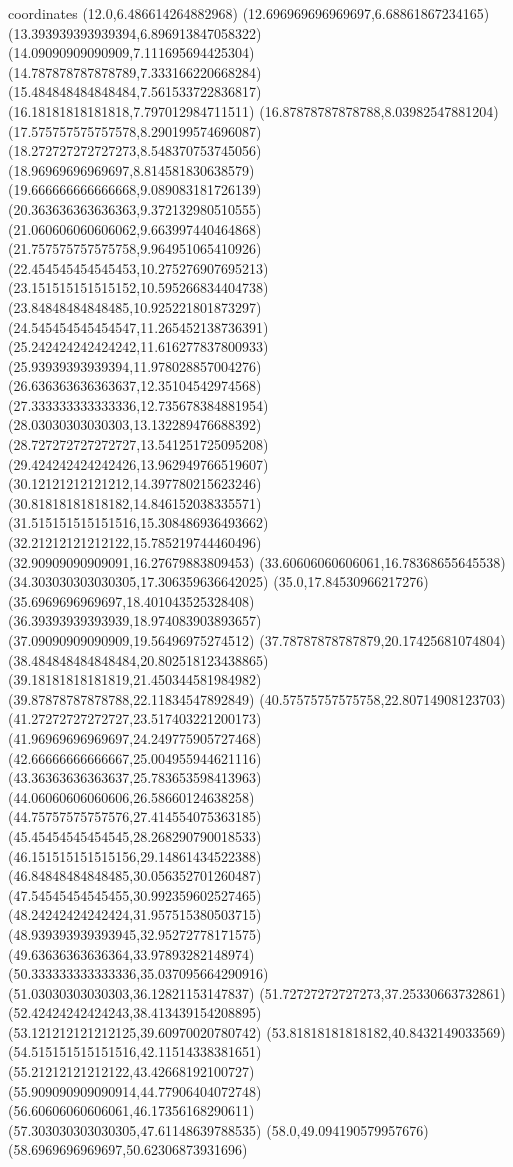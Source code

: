 coordinates {%
(12.0,6.486614264882968)
(12.696969696969697,6.68861867234165)
(13.393939393939394,6.896913847058322)
(14.09090909090909,7.111695694425304)
(14.787878787878789,7.333166220668284)
(15.484848484848484,7.561533722836817)
(16.18181818181818,7.797012984711511)
(16.87878787878788,8.03982547881204)
(17.575757575757578,8.290199574696087)
(18.272727272727273,8.548370753745056)
(18.96969696969697,8.814581830638579)
(19.666666666666668,9.089083181726139)
(20.363636363636363,9.372132980510555)
(21.060606060606062,9.663997440464868)
(21.757575757575758,9.964951065410926)
(22.454545454545453,10.275276907695213)
(23.151515151515152,10.595266834404738)
(23.84848484848485,10.925221801873297)
(24.545454545454547,11.265452138736391)
(25.242424242424242,11.616277837800933)
(25.93939393939394,11.978028857004276)
(26.636363636363637,12.35104542974568)
(27.333333333333336,12.735678384881954)
(28.03030303030303,13.132289476688392)
(28.727272727272727,13.541251725095208)
(29.424242424242426,13.962949766519607)
(30.12121212121212,14.397780215623246)
(30.81818181818182,14.846152038335571)
(31.515151515151516,15.308486936493662)
(32.21212121212122,15.785219744460496)
(32.90909090909091,16.27679883809453)
(33.60606060606061,16.78368655645538)
(34.303030303030305,17.306359636642025)
(35.0,17.84530966217276)
(35.6969696969697,18.401043525328408)
(36.39393939393939,18.974083903893657)
(37.09090909090909,19.56496975274512)
(37.78787878787879,20.17425681074804)
(38.484848484848484,20.802518123438865)
(39.18181818181819,21.450344581984982)
(39.87878787878788,22.11834547892849)
(40.57575757575758,22.80714908123703)
(41.27272727272727,23.517403221200173)
(41.96969696969697,24.249775905727468)
(42.66666666666667,25.004955944621116)
(43.36363636363637,25.783653598413963)
(44.06060606060606,26.58660124638258)
(44.75757575757576,27.414554075363185)
(45.45454545454545,28.268290790018533)
(46.151515151515156,29.14861434522388)
(46.84848484848485,30.056352701260487)
(47.54545454545455,30.992359602527465)
(48.24242424242424,31.957515380503715)
(48.939393939393945,32.95272778171575)
(49.63636363636364,33.97893282148974)
(50.333333333333336,35.037095664290916)
(51.03030303030303,36.12821153147837)
(51.72727272727273,37.25330663732861)
(52.42424242424243,38.413439154208895)
(53.121212121212125,39.60970020780742)
(53.81818181818182,40.8432149033569)
(54.515151515151516,42.11514338381651)
(55.21212121212122,43.42668192100727)
(55.909090909090914,44.77906404072748)
(56.60606060606061,46.17356168290611)
(57.303030303030305,47.61148639788535)
(58.0,49.094190579957676)
(58.6969696969697,50.62306873931696)
}

